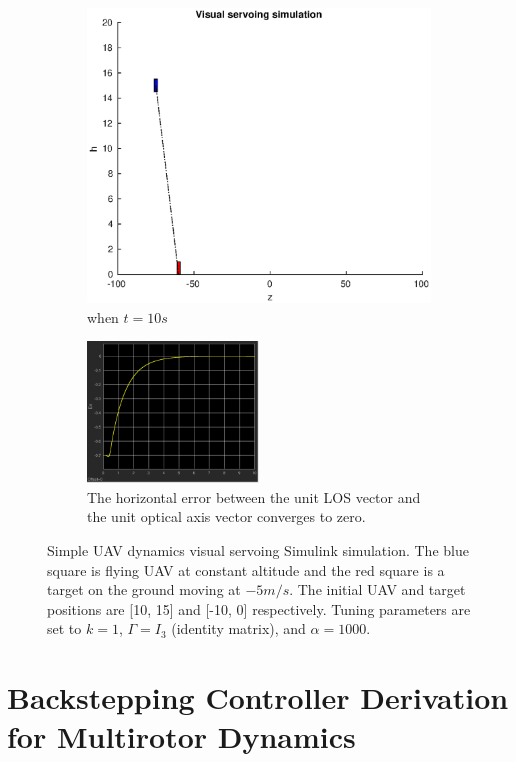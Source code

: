 \begin{figure}[htbp]
\begin{subfigure}[t]{0.45\linewidth}
		\includegraphics[width=\textwidth]{images/chapter4/another_simple_ten}
		\caption{when $t=10s$}
	\end{subfigure}
	\begin{subfigure}[t]{0.8\linewidth}
		\centering
		\includegraphics[width=0.5\textwidth]{images/chapter4/another_simple_ex}
		\caption{The horizontal error between the unit LOS vector and the unit optical axis vector converges to zero.}
	\end{subfigure}	
	\caption{Simple UAV dynamics visual servoing Simulink simulation. The blue square is flying UAV at constant altitude and the red square is a target on the ground moving at $-5m/s$. The initial UAV and target positions are [10, 15] and [-10, 0] respectively. Tuning parameters are set to $k=1$, $\Gamma=I_3$ (identity matrix), and $\alpha=1000$.}
	\label{another_simple_simulation}
\end{figure}


\section{Backstepping Controller Derivation for Multirotor Dynamics}
